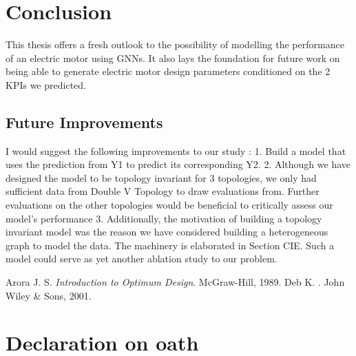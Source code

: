 \documentclass{report} %
\begin{document}
\chapter{Conclusion}

This thesis offers a fresh outlook to the possibility of modelling the performance of an electric motor using \ac{GNN}s.
It also lays the foundation for future work on being able to generate electric motor design parameters conditioned on the 2 KPIs we predicted.

\section{Future Improvements}\label{sec:Future Improvements}

I would suggest the following improvements to our study : \cite{Arora-1989}
1. Build a model that uses the prediction from Y1 to predict its corresponding Y2. 
2. Although we have designed the model to be topology invariant for 3 topologies, we only had sufficient data from Double V Topology to draw evaluations from.
Further evaluations on the other topologies would be beneficial to critically assess our model's performance
3. Additionally, the motivation of building a topology invariant model was the reason we have considered building a heterogeneous graph to model the data. The machinery is elaborated in Section CIE.
Such a model could serve as yet another ablation study to our problem.


\newpage 

\newpage 

\listoffigures

\newpage 

\newpage 

\listoftables

\newpage 

\newpage 

\begin{thebibliography}{0000}
    Arora J. S. {\em Introduction to Optimum Design}. McGraw-Hill, 1989.
    \newblock Deb K.
    .
    \newblock John Wiley \& Sons, 2001.
    \end{thebibliography}
\newpage 

\newpage 

\chapter*{Declaration on oath}
\end{document}
